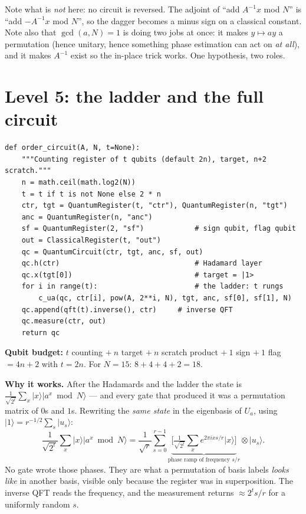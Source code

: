 \documentclass[11pt]{article}
\renewcommand{\ket}[1]{\lvert #1 \rangle}
\theoremstyle{plain}
\theoremstyle{remark}
\begin{document}
Note what is \emph{not} here: no circuit is reversed. The adjoint of ``add $A^{-1}x$ mod $N$'' is
``add $-A^{-1}x$ mod $N$'', so the dagger becomes a minus sign on a classical constant. Note also
that $\gcd(a,N)=1$ is doing two jobs at once: it makes $y\mapsto ay$ a permutation (hence unitary,
hence something phase estimation can act on \emph{at all}), and it makes $A^{-1}$ exist so the
in-place trick works. One hypothesis, two roles.

\section{Level 5: the ladder and the full circuit}\label{im:sec:l5}

\begin{lstlisting}
def order_circuit(A, N, t=None):
    """Counting register of t qubits (default 2n), target, n+2 scratch."""
    n = math.ceil(math.log2(N))
    t = t if t is not None else 2 * n
    ctr, tgt = QuantumRegister(t, "ctr"), QuantumRegister(n, "tgt")
    anc = QuantumRegister(n, "anc")
    sf = QuantumRegister(2, "sf")            # sign qubit, flag qubit
    out = ClassicalRegister(t, "out")
    qc = QuantumCircuit(ctr, tgt, anc, sf, out)
    qc.h(ctr)                                # Hadamard layer
    qc.x(tgt[0])                             # target = |1>
    for i in range(t):                       # the ladder: t rungs
        c_ua(qc, ctr[i], pow(A, 2**i, N), tgt, anc, sf[0], sf[1], N)
    qc.append(qft(t).inverse(), ctr)     # inverse QFT
    qc.measure(ctr, out)
    return qc
\end{lstlisting}

\textbf{Qubit budget:} $t$ counting $+\ n$ target $+\ n$ scratch product $+\ 1$ sign $+\ 1$ flag
$=4n+2$ with $t=2n$. For $N=15$: $8+4+4+2=18$.

\textbf{Why it works.} After the Hadamards and the ladder the state is
$\frac1{\sqrt{2^t}}\sum_x\ket x\ket{a^x\bmod N}$ --- and every gate that produced it was a
permutation matrix of $0$s and $1$s. Rewriting the \emph{same state} in the eigenbasis of $U_a$,
using $\ket1=r^{-1/2}\sum_s\ket{u_s}$:
\[
\frac1{\sqrt{2^t}}\sum_x\ket x\ket{a^x\bmod N}
=\frac1{\sqrt r}\sum_{s=0}^{r-1}
\underbrace{\Big[\tfrac1{\sqrt{2^t}}\sum_x e^{2\pi ixs/r}\ket x\Big]}_{\text{phase ramp of frequency } s/r}
\otimes\ket{u_s}.
\]
No gate wrote those phases. They are what a permutation of basis labels \emph{looks like} in
another basis, visible only because the register was in superposition. The inverse QFT reads the
frequency, and the measurement returns $\approx 2^t s/r$ for a uniformly random $s$.
\end{document}
